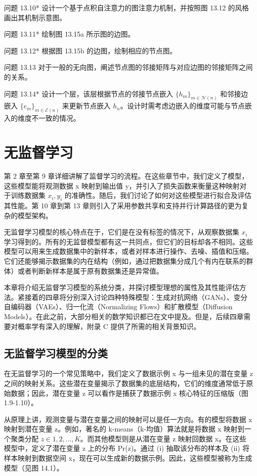 \documentclass[lang=cn,newtx,10pt,scheme=chinese]{elegantbook}
\begin{document}
问题 13.10* 设计一个基于点积自注意力的图注意力机制，并按照图 13.12 的风格画出其机制示意图。

问题 13.11* 绘制图 13.15a 所示图的边图。

问题 13.12* 根据图 13.15b 的边图，绘制相应的节点图。

问题 13.13 对于一般的无向图，阐述节点图的邻接矩阵与对应边图的邻接矩阵之间的关系。

问题 13.14* 设计一个层，该层根据节点的邻接节点嵌入 \(\{h_m\}_{m\in\mathcal{N}(n)}\) 和邻接边嵌入 \(\{e_m\}_{m\in\mathcal{E}(n)}\) 来更新节点嵌入 \(h_n\)。设计时需考虑边嵌入的维度可能与节点嵌入的维度不一致的情况。


\chapter{无监督学习}

第 2 章至第 9 章详细讲解了监督学习的流程。在这些章节中，我们定义了模型，这些模型能将观测数据 x 映射到输出值 y，并引入了损失函数来衡量这种映射对于训练数据集 \({x_i , y_i }\) 的准确性。随后，我们讨论了如何对这些模型进行拟合及评估其性能。第 10 章到第 13 章则引入了采用参数共享和支持并行计算路径的更为复杂的模型架构。

无监督学习模型的核心特点在于，它们是在没有标签的情况下，从观察数据集 \({x_i}\) 学习得到的。所有的无监督模型都有这一共同点，但它们的目标却各不相同。这些模型可以用来生成数据集中的新样本，或者对样本进行操作、去噪、插值和压缩。它们还能够揭示数据集的内在结构（例如，通过把数据集分成几个有内在联系的群体）或者判断新样本是属于原有数据集还是异常值。

本章将介绍无监督学习模型的系统分类，并探讨模型理想的属性及其性能评估方法。紧接着的四章将分别深入讨论四种特殊模型：生成对抗网络（GANs）、变分自编码器（VAEs）、归一化流（Normalizing Flows）和扩散模型（Diffusion Models）。在此之前，大部分相关的数学知识都已在文中提及。但是，后续四章需要对概率学有深入的理解，附录 C 提供了所需的相关背景知识。

\section{无监督学习模型的分类}
在无监督学习的一个常见策略中，我们定义了数据示例 x 与一组未见的潜在变量 z 之间的映射关系。这些潜在变量揭示了数据集的底层结构，它们的维度通常低于原始数据；因此，潜在变量 z 可以看作是捕获了数据示例 x 核心特征的压缩版（图 1.9-1.10）。

从原理上讲，观测变量与潜在变量之间的映射可以是任一方向。有的模型将数据 x 映射到潜在变量 z。例如，著名的 k-means（k-均值）算法就是将数据 x 映射到一个聚类分配 \(z \in {1,2,...,K}\)。而其他模型则是从潜在变量 z 映射回数据 x。在这些模型中，定义了潜在变量 z 上的分布 Pr(z)。通过 (i) 抽取该分布的样本及 (ii) 将样本映射到数据空间 x，现在可以生成新的数据示例。因此，这些模型被称为生成模型（见图 14.1）。
\end{document}
